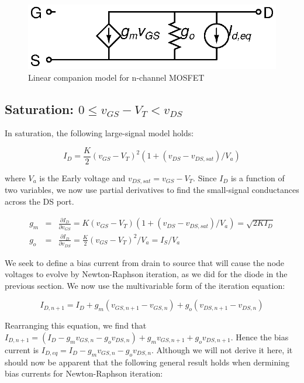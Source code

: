 \documentclass{article}
\begin{document}
\begin{figure}[h]
\begin{center}
\includegraphics{../fig/nmos.eps}
\caption{Linear companion model for n-channel MOSFET \label{fig:nmos}}
\end{center}
\end{figure}

\subsection{Saturation: $ 0 \leq v_{GS} - V_T < v_{DS} $}

In saturation, the following large-signal model holds:

\begin{equation}
I_D=\frac{K}{2}(v_{GS}-V_T)^2 (1+(v_{DS}-v_{DS,sat})/V_a)
\end{equation}

where $V_a$ is the Early voltage and  $v_{DS,sat}=v_{GS}-V_T$.  Since $I_D$ is a function of two variables, we now use partial derivatives to find the small-signal conductances across the DS port.

\begin{eqnarray}
g_m&=&\frac{\partial I_D}{\partial v_{GS}}=K(v_{GS}-V_T)(1+(v_{DS}-v_{DS,sat})/V_a)=\sqrt{2KI_D} \\
g_o&=&\frac{\partial I_D}{\partial v_{DS}}=\frac{K}{2}(v_{GS}-V_T)^2 / V_a=I_S/V_a
\end{eqnarray}

We seek to define a bias current from drain to source that will cause the node voltages to evolve by Newton-Raphson iteration, as we did for the diode in the previous section.  We now use the multivariable form of the iteration equation:

\begin{equation}
I_{D,n+1}=I_D+g_m(v_{GS,n+1}-v_{GS,n})+g_o(v_{DS,n+1}-v_{DS,n})
\end{equation}

Rearranging this equation, we find that $I_{D,n+1}=(I_D-g_mv_{GS,n}-g_ov_{DS,n})+g_mv_{GS,n+1}+g_ov_{DS,n+1}$.  Hence the bias current is $I_{D,eq}=I_D-g_mv_{GS,n}-g_ov_{DS,n}$.  Although we will not derive it here, it should now be apparent that the following general result holds when dermining bias currents for Newton-Raphson iteration:
\end{document}
